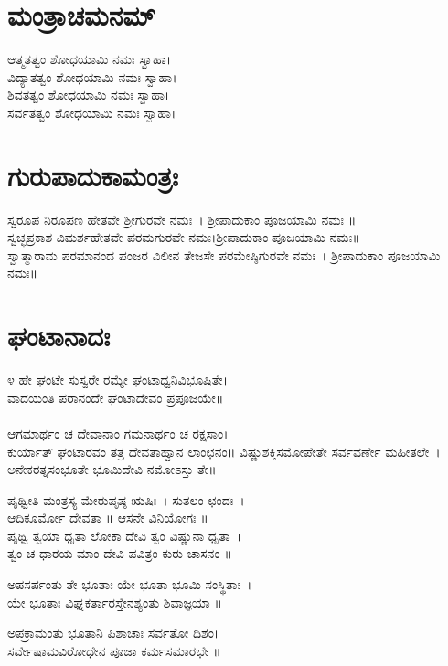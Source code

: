 \section{ಮಂತ್ರಾಚಮನಮ್}
 ಆತ್ಮತತ್ವಂ ಶೋಧಯಾಮಿ ನಮಃ ಸ್ವಾಹಾ।\\
 ವಿದ್ಯಾತತ್ವಂ ಶೋಧಯಾಮಿ ನಮಃ ಸ್ವಾಹಾ।\\
 ಶಿವತತ್ವಂ ಶೋಧಯಾಮಿ ನಮಃ ಸ್ವಾಹಾ।\\
 ಸರ್ವತತ್ವಂ ಶೋಧಯಾಮಿ ನಮಃ ಸ್ವಾಹಾ।
\section{ಗುರುಪಾದುಕಾಮಂತ್ರಃ}
 ಸ್ವರೂಪ ನಿರೂಪಣ ಹೇತವೇ ಶ್ರೀಗುರವೇ ನಮಃ~। ಶ್ರೀಪಾದುಕಾಂ ಪೂಜಯಾಮಿ ನಮಃ ॥\\
 ಸ್ವಚ್ಛಪ್ರಕಾಶ ವಿಮರ್ಶಹೇತವೇ ಪರಮಗುರವೇ ನಮಃ।ಶ್ರೀಪಾದುಕಾಂ ಪೂಜಯಾಮಿ ನಮಃ॥\\
 ಸ್ವಾತ್ಮಾರಾಮ ಪರಮಾನಂದ ಪಂಜರ ವಿಲೀನ ತೇಜಸೇ ಪರಮೇಷ್ಠಿಗುರವೇ ನಮಃ~। ಶ್ರೀಪಾದುಕಾಂ ಪೂಜಯಾಮಿ ನಮಃ॥
\section{ಘಂಟಾನಾದಃ}
೪ ಹೇ ಘಂಟೇ ಸುಸ್ವರೇ ರಮ್ಯೇ ಘಂಟಾಧ್ವನಿವಿಭೂಷಿತೇ।\\
ವಾದಯಂತಿ ಪರಾನಂದೇ ಘಂಟಾದೇವಂ ಪ್ರಪೂಜಯೇ॥\\
\\
ಆಗಮಾರ್ಥಂ ಚ ದೇವಾನಾಂ ಗಮನಾರ್ಥಂ ಚ ರಕ್ಷಸಾಂ।\\
ಕುರ್ಯಾತ್ ಘಂಟಾರವಂ ತತ್ರ ದೇವತಾಹ್ವಾನ ಲಾಂಛನಂ॥
\newpage
ವಿಷ್ಣುಶಕ್ತಿಸಮೋಪೇತೇ ಸರ್ವವರ್ಣೇ ಮಹೀತಲೇ~।\\
ಅನೇಕರತ್ನಸಂಭೂತೇ ಭೂಮಿದೇವಿ ನಮೋಽಸ್ತು ತೇ॥

ಪೃಥ್ವೀತಿ ಮಂತ್ರಸ್ಯ ಮೇರುಪೃಷ್ಠ ಋಷಿಃ~। ಸುತಲಂ ಛಂದಃ~।\\ಆದಿಕೂರ್ಮೋ ದೇವತಾ ॥ ಆಸನೇ ವಿನಿಯೋಗಃ ॥\\
ಪೃಥ್ವಿ ತ್ವಯಾ ಧೃತಾ ಲೋಕಾ ದೇವಿ ತ್ವಂ ವಿಷ್ಣುನಾ ಧೃತಾ~।\\
ತ್ವಂ ಚ ಧಾರಯ ಮಾಂ ದೇವಿ ಪವಿತ್ರಂ ಕುರು ಚಾಸನಂ ॥

ಅಪಸರ್ಪಂತು ತೇ ಭೂತಾಃ ಯೇ ಭೂತಾ ಭೂಮಿ ಸಂಸ್ಥಿತಾಃ~।\\
ಯೇ ಭೂತಾಃ ವಿಘ್ನಕರ್ತಾರಸ್ತೇನಶ್ಯಂತು ಶಿವಾಜ್ಞಯಾ ॥

ಅಪಕ್ರಾಮಂತು ಭೂತಾನಿ ಪಿಶಾಚಾಃ ಸರ್ವತೋ ದಿಶಂ।\\
ಸರ್ವೇಷಾಮವಿರೋಧೇನ ಪೂಜಾ ಕರ್ಮಸಮಾರಭೇ ॥

